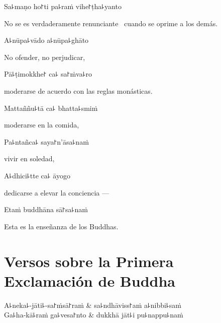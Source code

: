 Sa꜕maṇo ho꜓ti pa꜕raṁ vihe꜓ṭha꜕yanto

\begin{english}
  No se es verdaderamente renunciante \pause\ cuando se oprime a los demás.
\end{english}

A꜕nūpa꜕vādo a꜕nūpa꜕ghāto

\begin{english}
  No ofender, no perjudicar,
\end{english}

Pā꜕ṭimokkhe꜓ ca꜕ sa꜓ṁva꜕ro

\begin{english}
  moderarse de acuerdo con las reglas monásticas.
\end{english}

Mattaññu꜕tā ca꜕ bhatta꜕smiṁ

\begin{english}
  moderarse en la comida,
\end{english}

Pa꜕ntañca꜕ saya꜓n'āsa꜕naṁ

\begin{english}
  vivir en soledad,
\end{english}

A꜕dhici꜕tte ca꜕ āyogo

\begin{english}
  dedicarse a elevar la conciencia ---
\end{english}

Etaṁ buddhāna sā꜓sa꜕naṁ

\begin{english}
  Esta es la enseñanza de los Buddhas.
\end{english}

\chapter[La Primera Exclamación]{Versos sobre la Primera Exclamación de Buddha}


\begin{leader}
\end{leader}

\begin{twochants}
  A꜕neka꜕-jāti꜕-sa꜓ṁsā꜓raṁ & sa꜕ndhāviss꜓aṁ a꜕nibbi꜕saṁ \\
  Ga꜕ha-kā꜕raṁ ga꜕vesa꜓nto & dukkhā jāt꜕i pu꜕nappu꜕naṁ \\
\end{twochants}

